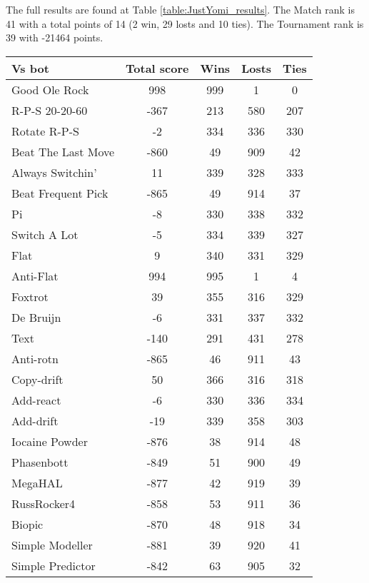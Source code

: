 The full results are found at Table \ref{table:JustYomi_results}. The Match rank is 41 with a total points of 14 (2 win, 29 losts and 10 ties). The Tournament rank is 39 with -21464 points.

\begin{table*}
    \caption{JustYomi results}
    \label{table:JustYomi_results}
    \centering
    \begin{tabular}{|l|c|c|c|c|}
        \hline
        \textbf{Vs bot} & \textbf{Total score} & \textbf{Wins} & \textbf{Losts} & \textbf{Ties} \\ \hline
Good Ole Rock & 998 & 999 & 1 & 0 \\ \hline 
R-P-S 20-20-60 & -367 & 213 & 580 & 207 \\ \hline 
Rotate R-P-S & -2 & 334 & 336 & 330 \\ \hline 
Beat The Last Move & -860 & 49 & 909 & 42 \\ \hline 
Always Switchin' & 11 & 339 & 328 & 333 \\ \hline 
Beat Frequent Pick & -865 & 49 & 914 & 37 \\ \hline 
Pi & -8 & 330 & 338 & 332 \\ \hline 
Switch A Lot & -5 & 334 & 339 & 327 \\ \hline 
Flat & 9 & 340 & 331 & 329 \\ \hline 
Anti-Flat & 994 & 995 & 1 & 4 \\ \hline 
Foxtrot & 39 & 355 & 316 & 329 \\ \hline 
De Bruijn & -6 & 331 & 337 & 332 \\ \hline 
Text & -140 & 291 & 431 & 278 \\ \hline 
Anti-rotn & -865 & 46 & 911 & 43 \\ \hline 
Copy-drift & 50 & 366 & 316 & 318 \\ \hline 
Add-react & -6 & 330 & 336 & 334 \\ \hline 
Add-drift & -19 & 339 & 358 & 303 \\ \hline 
Iocaine Powder & -876 & 38 & 914 & 48 \\ \hline 
Phasenbott & -849 & 51 & 900 & 49 \\ \hline 
MegaHAL & -877 & 42 & 919 & 39 \\ \hline 
RussRocker4 & -858 & 53 & 911 & 36 \\ \hline 
Biopic & -870 & 48 & 918 & 34 \\ \hline 
Simple Modeller & -881 & 39 & 920 & 41 \\ \hline 
Simple Predictor & -842 & 63 & 905 & 32 \\ \hline 

\end{tabular}
\end{table*}
